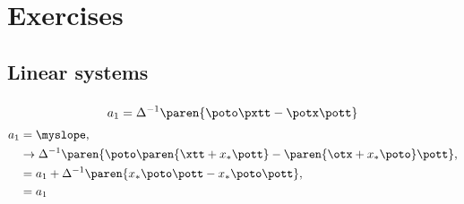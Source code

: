 \chapter{Exercises}   %

\section{Linear systems}  %

\subsection{}  %
  \begin{equation*}   %
      a_{1} = \Delta^{-1} \paren{ \poto \pxtt - \potx \pott }
  \end{equation*}
  \begin{equation*}   %
    \begin{split}
      a_{1} &= \myslope, \\
            &\rightarrow \Delta^{-1} \paren{\poto \paren{\xtt + x_{*} \pott} - \paren{\otx + x_{*} \poto} \pott}, \\
            &= a_{1} + \Delta^{-1} \paren{x_{*} \poto \pott - x_{*}\poto\pott}, \\
            &= a_{1} 
    \end{split}
  \end{equation*}


\endinput